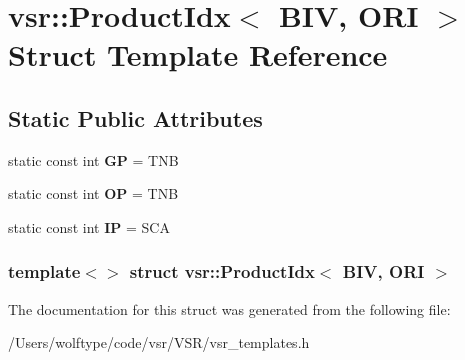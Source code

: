 \hypertarget{structvsr_1_1_product_idx_3_01_b_i_v_00_01_o_r_i_01_4}{\section{vsr\-:\-:Product\-Idx$<$ B\-I\-V, O\-R\-I $>$ Struct Template Reference}
\label{structvsr_1_1_product_idx_3_01_b_i_v_00_01_o_r_i_01_4}
}
\subsection*{Static Public Attributes}
\begin{DoxyCompactItemize}
\item 
\hypertarget{structvsr_1_1_product_idx_3_01_b_i_v_00_01_o_r_i_01_4_ac1a7145659391ce68770c7d178fba649}{static const int {\bfseries G\-P} = T\-N\-B}\label{structvsr_1_1_product_idx_3_01_b_i_v_00_01_o_r_i_01_4_ac1a7145659391ce68770c7d178fba649}

\item 
\hypertarget{structvsr_1_1_product_idx_3_01_b_i_v_00_01_o_r_i_01_4_a7e681fb5e3ebcb6f19b852f8b4d73ec8}{static const int {\bfseries O\-P} = T\-N\-B}\label{structvsr_1_1_product_idx_3_01_b_i_v_00_01_o_r_i_01_4_a7e681fb5e3ebcb6f19b852f8b4d73ec8}

\item 
\hypertarget{structvsr_1_1_product_idx_3_01_b_i_v_00_01_o_r_i_01_4_a379bc493bd1bc08293a74f42f220bc33}{static const int {\bfseries I\-P} = S\-C\-A}\label{structvsr_1_1_product_idx_3_01_b_i_v_00_01_o_r_i_01_4_a379bc493bd1bc08293a74f42f220bc33}

\end{DoxyCompactItemize}
\subsubsection*{template$<$$>$ struct vsr\-::\-Product\-Idx$<$ B\-I\-V, O\-R\-I $>$}



The documentation for this struct was generated from the following file\-:\begin{DoxyCompactItemize}
\item 
/\-Users/wolftype/code/vsr/\-V\-S\-R/vsr\-\_\-templates.\-h\end{DoxyCompactItemize}
